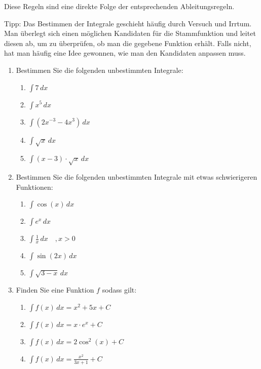 Diese Regeln sind eine direkte Folge der entsprechenden Ableitungsregeln.

\begin{ueb}
	{}{}
	Tipp: Das Bestimmen der Integrale geschieht häufig durch Versuch und Irrtum. Man überlegt sich einen möglichen Kandidaten für die Stammfunktion und leitet diesen ab, um zu überprüfen, ob man die gegebene Funktion erhält. Falls nicht, hat man häufig eine Idee gewonnen, wie man den Kandidaten anpassen muss.


	\begin{enumerate}
		\item Bestimmen Sie die folgenden unbestimmten Integrale:
		      \begin{enumerate}
			      \item $\int 7 \, dx$
			      \item $\int x^5 \, dx$
			      \item $\int (2x^{-3} -4x^3) \, dx$
			      \item $\int \sqrt{x} \, dx$
			      \item $\int (x-3) \cdot \sqrt{x} \, dx$
		      \end{enumerate}
		\item Bestimmen Sie die folgenden unbestimmten Integrale mit etwas schwierigeren Funktionen:
		      \begin{enumerate}
			      \item $\int \cos(x) \, dx$
			      \item $\int e^x \, dx$
			      \item $\int \frac{1}{x} \, dx \quad , x>0$
			      \item $\int \sin(2x) \, dx$
			      \item $\int \sqrt{3-x} \, dx$
		      \end{enumerate}
		\item Finden Sie eine Funktion $f$ sodass gilt:
		      \begin{enumerate}
			      \item $\int f(x) \, dx = x^2+5x+C$
			      \item $\int f(x) \, dx = x\cdot e^x + C$
			      \item $\int f(x) \, dx = 2 \cos^2(x) +C$
			      \item $\int f(x) \, dx = \frac{x^2}{3x+1} + C$
		      \end{enumerate}
	\end{enumerate}


\end{ueb}
\clearpage
